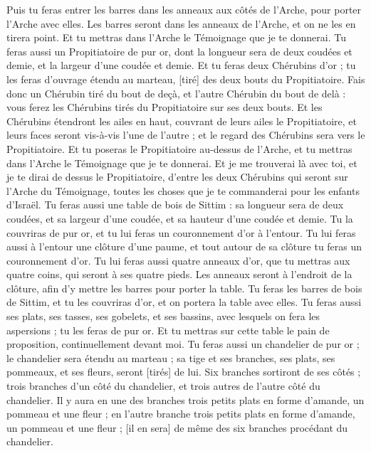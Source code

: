 \begin{multicols}{2}
Puis tu feras entrer les barres dans les anneaux aux côtés de l'Arche, pour porter l'Arche avec elles.
Les barres seront dans les anneaux de l'Arche, et on ne les en tirera point.
Et tu mettras dans l'Arche le Témoignage que je te donnerai.
Tu feras aussi un Propitiatoire de pur or, dont la longueur sera de deux coudées et demie, et la largeur d'une coudée et demie.
Et tu feras deux Chérubins d'or ; tu les feras d'ouvrage étendu au marteau, [tiré] des deux bouts du Propitiatoire.
Fais donc un Chérubin tiré du bout de deçà, et l'autre Chérubin du bout de delà : vous ferez les Chérubins tirés du Propitiatoire sur ses deux bouts.
Et les Chérubins étendront les ailes en haut, couvrant de leurs ailes le Propitiatoire, et leurs faces seront vis-à-vis l'une de l'autre ; et le regard des Chérubins sera vers le Propitiatoire.
Et tu poseras le Propitiatoire au-dessus de l'Arche, et tu mettras dans l'Arche le Témoignage que je te donnerai.
Et je me trouverai là avec toi, et je te dirai de dessus le Propitiatoire, d'entre les deux Chérubins qui seront sur l'Arche du Témoignage, toutes les choses que je te commanderai pour les enfants d'Israël.
Tu feras aussi une table de bois de Sittim : sa longueur sera de deux coudées, et sa largeur d'une coudée, et sa hauteur d'une coudée et demie.
Tu la couvriras de pur or, et tu lui feras un couronnement d'or à l’entour.
Tu lui feras aussi à l’entour une clôture d'une paume, et tout autour de sa clôture tu feras un couronnement d'or.
Tu lui feras aussi quatre anneaux d'or, que tu mettras aux quatre coins, qui seront à ses quatre pieds.
Les anneaux seront à l'endroit de la clôture, afin d'y mettre les barres pour porter la table.
Tu feras les barres de bois de Sittim, et tu les couvriras d'or, et on portera la table avec elles.
Tu feras aussi ses plats, ses tasses, ses gobelets, et ses bassins, avec lesquels on fera les aspersions ; tu les feras de pur or.
Et tu mettras sur cette table le pain de proposition, continuellement devant moi.
Tu feras aussi un chandelier de pur or ; le chandelier sera étendu au marteau ; sa tige et ses branches, ses plats, ses pommeaux, et ses fleurs, seront [tirés] de lui.
Six branches sortiront de ses côtés ; trois branches d'un côté du chandelier, et trois autres de l'autre côté du chandelier.
Il y aura en une des branches trois petits plats en forme d'amande, un pommeau et une fleur ; en l'autre branche trois petits plats en forme d'amande, un pommeau et une fleur ; [il en sera] de même des six branches procédant du chandelier.

\end{multicols}
